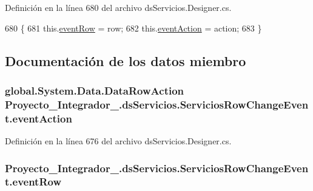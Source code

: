 Definición en la línea 680 del archivo ds\-Servicios.\-Designer.\-cs.


\begin{DoxyCode}
680                                                                                                      \{
681                 this.\hyperlink{class_proyecto___integrador__3_1_1ds_servicios_1_1_servicios_row_change_event_a2ab15bbb410f9e1c8cf86b58b94885ed}{eventRow} = row;
682                 this.\hyperlink{class_proyecto___integrador__3_1_1ds_servicios_1_1_servicios_row_change_event_a8455673a7ed254e57909ec6af9648dc6}{eventAction} = action;
683             \}
\end{DoxyCode}


\subsection{Documentación de los datos miembro}
\hypertarget{class_proyecto___integrador__3_1_1ds_servicios_1_1_servicios_row_change_event_a8455673a7ed254e57909ec6af9648dc6}{
\subsubsection[{event\-Action}]{\setlength{\rightskip}{0pt plus 5cm}global.\-System.\-Data.\-Data\-Row\-Action Proyecto\-\_\-\-Integrador\-\_.\-ds\-Servicios.\-Servicios\-Row\-Change\-Event.\-event\-Action\hspace{0.3cm}{\ttfamily [private]}}}\label{class_proyecto___integrador__3_1_1ds_servicios_1_1_servicios_row_change_event_a8455673a7ed254e57909ec6af9648dc6}


Definición en la línea 676 del archivo ds\-Servicios.\-Designer.\-cs.

\hypertarget{class_proyecto___integrador__3_1_1ds_servicios_1_1_servicios_row_change_event_a2ab15bbb410f9e1c8cf86b58b94885ed}{
\subsubsection[{event\-Row}]{ Proyecto\-\_\-\-Integrador\-\_.\-ds\-Servicios.\-Servicios\-Row\-Change\-Event.\-event\-Row\hspace{0.3cm}{\ttfamily [private]}}}\label{class_proyecto___integrador__3_1_1ds_servicios_1_1_servicios_row_change_event_a2ab15bbb410f9e1c8cf86b58b94885ed}


